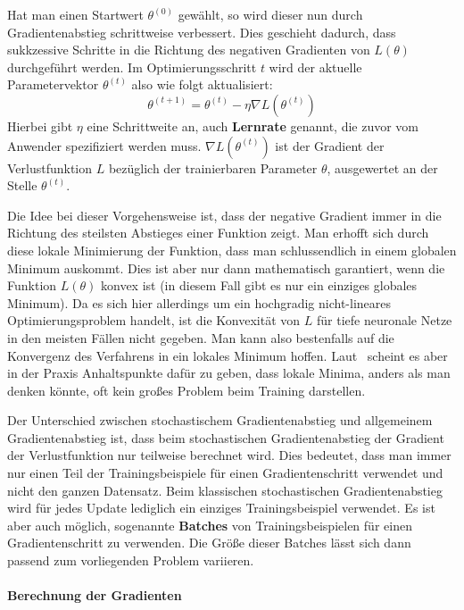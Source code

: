 Hat man einen Startwert $\theta^{(0)}$ gew\"ahlt, so wird dieser nun
durch Gradientenabstieg schrittweise verbessert.
Dies geschieht dadurch, dass sukkzessive Schritte in die Richtung
des negativen Gradienten von $L(\theta)$ durchgef\"uhrt werden.
Im Optimierungsschritt $t$ wird der aktuelle Parametervektor $\theta^{(t)}$
also wie folgt aktualisiert:
\begin{equation}
    \theta^{(t+1)} = \theta^{(t)} - \eta \nabla L(\theta^{(t)})
\end{equation}
Hierbei gibt $\eta$ eine Schrittweite an, auch \textbf{Lernrate} genannt,
die zuvor vom Anwender spezifiziert werden muss. $\nabla L(\theta^{(t)})$
ist der Gradient der Verlustfunktion $L$ bez\"uglich der
trainierbaren Parameter $\theta$, ausgewertet an der Stelle
$\theta^{(t)}$.

Die Idee bei dieser Vorgehensweise ist, dass der negative Gradient immer in die Richtung
des steilsten Abstieges einer Funktion zeigt.
Man erhofft sich durch diese lokale Minimierung der Funktion, dass
man schlussendlich in einem globalen Minimum auskommt. Dies ist aber nur
dann mathematisch garantiert, wenn die Funktion $L(\theta)$ konvex ist
(in diesem Fall gibt es nur ein einziges globales Minimum).
Da es sich hier allerdings um ein hochgradig nicht-lineares Optimierungsproblem
handelt, ist die Konvexit\"at von $L$ f\"ur tiefe neuronale Netze in den
meisten F\"allen nicht gegeben. Man kann also bestenfalls auf die Konvergenz
des Verfahrens in ein lokales Minimum hoffen.
Laut~\cite{local_minima} scheint es aber in der Praxis Anhaltspunkte
daf\"ur zu geben, dass lokale Minima, anders als man denken k\"onnte,
oft kein gro{\ss}es Problem beim Training darstellen.

Der Unterschied zwischen stochastischem Gradientenabstieg und
allgemeinem Gradientenabstieg ist, dass beim stochastischen
Gradientenabstieg der Gradient der Verlustfunktion nur
teilweise berechnet wird. Dies bedeutet, dass man immer nur einen
Teil der Trainingsbeispiele f\"ur einen Gradientenschritt verwendet
und nicht den ganzen Datensatz. Beim klassischen stochastischen
Gradientenabstieg wird f\"ur jedes Update lediglich ein einziges
Trainingsbeispiel verwendet. Es ist aber auch m\"oglich, sogenannte
\textbf{Batches} von Trainingsbeispielen f\"ur einen
Gradientenschritt zu verwenden. Die Gr\"o{\ss}e dieser Batches
l\"asst sich dann passend zum vorliegenden Problem variieren.

\paragraph{Berechnung der Gradienten}

